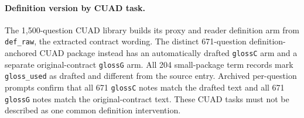 \paragraph{Definition version by CUAD task.}
The 1,500-question CUAD library builds its proxy and reader definition arm from \texttt{def\_raw}, the extracted contract wording. The distinct 671-question definition-anchored CUAD package instead has an automatically drafted \texttt{glossC} arm and a separate original-contract \texttt{glossG} arm. All 204 small-package term records mark \texttt{gloss\_used} as drafted and different from the source entry. Archived per-question prompts confirm that all 671 \texttt{glossC} notes match the drafted text and all 671 \texttt{glossG} notes match the original-contract text. These CUAD tasks must not be described as one common definition intervention.






